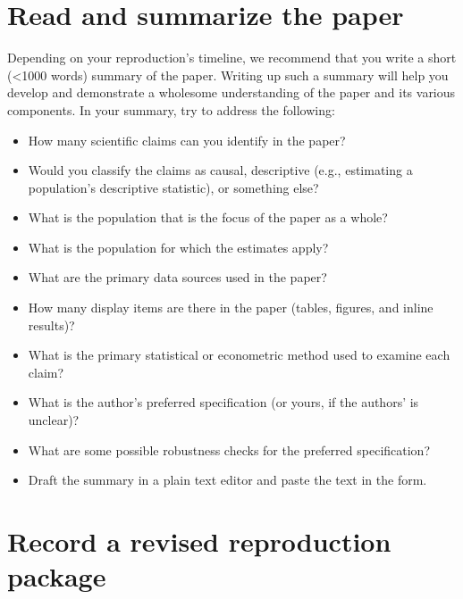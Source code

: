 \documentclass[
]{book}
\providecommand{\tightlist}{%
  \setlength{\itemsep}{0pt}\setlength{\parskip}{0pt}}
\begin{document}
\hypertarget{read-sum}{%
\section{Read and summarize the paper}\label{read-sum}}

Depending on your reproduction's timeline, we recommend that you write a short (\textless1000 words) summary of the paper. Writing up such a summary will help you develop and demonstrate a wholesome understanding of the paper and its various components. In your summary, try to address the following:

\begin{itemize}
\tightlist
\item
  How many scientific claims can you identify in the paper?
\item
  Would you classify the claims as causal, descriptive (e.g., estimating a population's descriptive statistic), or something else?\\
\item
  What is the population that is the focus of the paper as a whole?\\
\item
  What is the population for which the estimates apply?\\
\item
  What are the primary data sources used in the paper?\\
\item
  How many display items are there in the paper (tables, figures, and inline results)?\\
\item
  What is the primary statistical or econometric method used to examine each claim?\\
\item
  What is the author's preferred specification (or yours, if the authors' is unclear)?\\
\item
  What are some possible robustness checks for the preferred specification?\\
\item
  Draft the summary in a plain text editor and paste the text in the form.
\end{itemize}

\hypertarget{record-a-revised-reproduction-package}{%
\section{Record a revised reproduction package}\label{record-a-revised-reproduction-package}}
\end{document}
